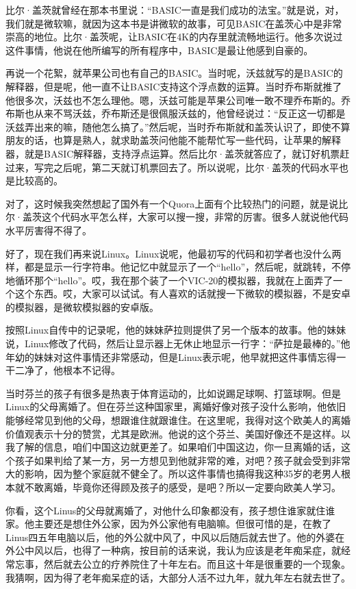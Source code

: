 \documentclass[
  letterpaper,
  DIV=11,
  numbers=noendperiod]{scrreprt}
\begin{document}
比尔·盖茨就曾经在那本书里说：``BASIC一直是我们成功的法宝。''就是说，对，我们就是微软嘛，就因为这本书是讲微软的故事，可见BASIC在盖茨心中是非常崇高的地位。比尔·盖茨呢，让BASIC在4K的内存里就流畅地运行。他多次说过这件事情，他说在他所编写的所有程序中，BASIC是最让他感到自豪的。

再说一个花絮，就苹果公司也有自己的BASIC。当时呢，沃兹就写的是BASIC的解释器，但是呢，他一直不让BASIC支持这个浮点数的运算。当时乔布斯就推了他很多次，沃兹也不怎么理他。嗯，沃兹可能是苹果公司唯一敢不理乔布斯的。乔布斯也从来不骂沃兹，乔布斯还是很佩服沃兹的，他曾经说过：``反正这一切都是沃兹弄出来的嘛，随他怎么搞了。''然后呢，当时乔布斯就和盖茨认识了，即使不算朋友的话，也算是熟人，就求助盖茨问他能不能帮忙写一些代码，让苹果的解释器，就是BASIC解释器，支持浮点运算。然后比尔·盖茨就答应了，就订好机票赶过来，写完之后呢，第二天就订机票回去了。所以说呢，比尔·盖茨的代码水平也是比较高的。

对了，这时候我突然想起了国外有一个Quora上面有个比较热门的问题，就是说比尔·盖茨这个代码水平怎么样，大家可以搜一搜，非常的厉害。很多人就说他代码水平厉害得不得了。

好了，现在我们再来说Linux。Linux说呢，他最初写的代码和初学者也没什么两样，都是显示一行字符串。他记忆中就显示了一个``hello''，然后呢，就跳转，不停地循环那个``hello''。哎，我在那个装了一个VIC-20的模拟器，我就在上面弄了一个这个东西。哎，大家可以试试。有人喜欢的话就搜一下微软的模拟器，不是安卓的模拟器，是微软模拟器的安卓版。

按照Linux自传中的记录呢，他的妹妹萨拉则提供了另一个版本的故事。他的妹妹说，Linux修改了代码，然后让显示器上无休止地显示一行字：``萨拉是最棒的。''他年幼的妹妹对这件事情还非常感动，但是Linux表示呢，他早就把这件事情忘得一干二净了，他根本不记得。

当时芬兰的孩子有很多是热衷于体育运动的，比如说踢足球啊、打篮球啊。但是Linux的父母离婚了。但在芬兰这种国家里，离婚好像对孩子没什么影响，他依旧能够经常见到他的父母，想跟谁住就跟谁住。在这里呢，我得对这个欧美人的离婚价值观表示十分的赞赏，尤其是欧洲。他说的这个芬兰、美国好像还不是这样。以我了解的信息，咱们中国这边就更差了。如果咱们中国这边，你一旦离婚的话，这个孩子如果判给了某一方，另一方想见到他就非常的难，对吧？孩子就会受到非常大的影响，因为整个家庭就不健全了。所以这件事情也搞得我这种35岁的老男人根本就不敢离婚，毕竟你还得顾及孩子的感受，是吧？所以一定要向欧美人学习。

你看，这个Linus的父母就离婚了，对他什么印象都没有，孩子想住谁家就住谁家。他主要还是想住外公家，因为外公家他有电脑嘛。但很可惜的是，在教了Linus四五年电脑以后，他的外公就中风了，中风以后随后就去世了。他的外婆在外公中风以后，也得了一种病，按目前的话来说，我认为应该是老年痴呆症，就经常忘事，然后就去公立的疗养院住了十年左右。而且这十年是很重要的一个现象。我猜啊，因为得了老年痴呆症的话，大部分人活不过九年，就九年左右就去世了。
\end{document}
